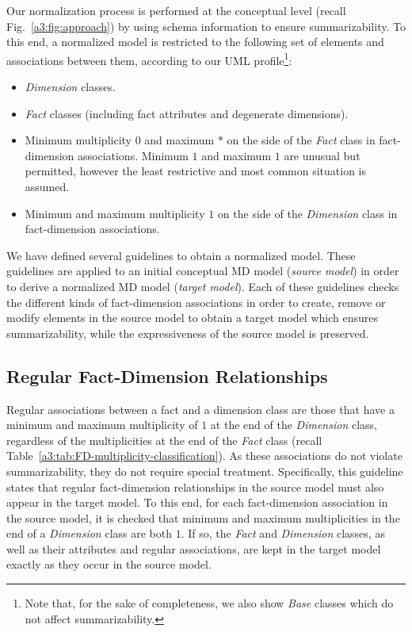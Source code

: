 Our normalization process is performed at the conceptual level
(recall Fig.~\ref{a3:fig:approach}) by using schema information to
ensure summarizability. To this end, a normalized model is
restricted to the following set of elements and associations between
them, according to our UML profile\footnote{Note that, for the sake
of completeness, we also show \emph{Base} classes which do not
affect summarizability.}:

\begin{itemize}
    \item \emph{Dimension} classes.
    \item \emph{Fact} classes (including fact attributes and degenerate dimensions).
    \item Minimum multiplicity $0$ and maximum $*$ on the side of the \emph{Fact} class in
    fact-dimension associations. Minimum $1$ and maximum $1$ are unusual but permitted,
    however the least restrictive and most common situation is assumed.
    \item Minimum and maximum multiplicity $1$ on the side of the \emph{Dimension} class in fact-dimension associations.
\end{itemize}

We have defined several guidelines to obtain a normalized model.
These guidelines are applied to an initial conceptual MD model
(\emph{source model}) in order to derive a normalized MD model
(\emph{target model}). Each of these guidelines checks the different
kinds of fact-dimension associations in order to create, remove or
modify elements in the source model to obtain a target model which
ensures summarizability, while the expressiveness of the source
model is preserved.

\subsection{Regular Fact-Dimension Relationships}
Regular associations between a fact and a dimension class are those
that have a minimum and maximum multiplicity of $1$ at the end of
the \emph{Dimension} class, regardless of the multiplicities at the
end of the \emph{Fact} class (recall
Table~\ref{a3:tab:FD-multiplicity-classification}). As these
associations do not violate summarizability, they do not require
special treatment. Specifically, this guideline states that regular
fact-dimension relationships in the source model must also appear in
the target model. To this end, for each fact-dimension association
in the source model, it is checked that minimum and maximum
multiplicities in the end of a \emph{Dimension} class are both $1$.
If so, the \emph{Fact} and \emph{Dimension} classes, as well as
their attributes and regular associations, are kept in the target
model exactly as they occur in the source model.



